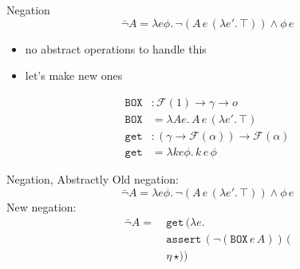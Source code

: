 \documentclass{beamer}
\newcommand{\lam}[2]{\lambda #1.\, #2}
\newcommand{\ap}[2]{#1\,#2}
\newcommand{\app}[3]{\ap{\ap{#1}{#2}}{#3}}
\newcommand{\op}[1]{\mathtt{#1}}
\newcommand{\FF}{\mathcal{F}}
\newcommand{\boxop}{\texttt{BOX}}
\begin{document}
\begin{frame}{Negation}
  $$
  \bar{\lnot} A = \lam{e \phi}{\lnot(\app{A}{e}{(\lam{e'}{\top})}) \land \ap{\phi}{e}}
  $$
  \pause
  \begin{itemize}
  \item no abstract operations to handle this
  \item let's make new ones
  \end{itemize}
  \pause
  \begin{align*}
  \boxop &: \FF(1) \to \gamma \to o \\
  \boxop &= \lam{A e}{\app{A}{e}{(\lam{e'}{\top})}} \\
  \op{get} &: (\gamma \to \FF(\alpha)) \to \FF(\alpha) \\
  \op{get} &= \lam{k e \phi}{\app{k}{e}{\phi}}
  \end{align*}
\end{frame}

\begin{frame}{Negation, Abstractly}
  Old negation:
  $$
  \bar{\lnot} A = \lam{e \phi}{\lnot(\app{A}{e}{(\lam{e'}{\top})}) \land \ap{\phi}{e}}
  $$
  \pause
  \vfill
  New negation:
  \begin{align*}
    \bar{\lnot} A =\ & \ap{\op{get}}{(\lam{e}{ \\
                    & \app{\op{assert}}{(\lnot(\app{\boxop}{e}{A}))}{( \\
                     & \ap{\eta}{\star})}})}
  \end{align*}
\end{frame}
\end{document}
